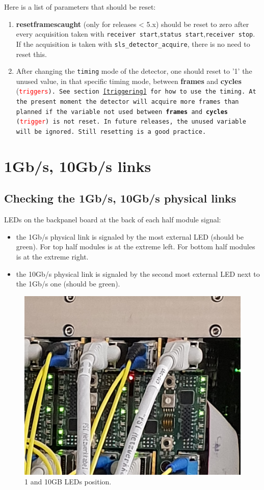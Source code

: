 \documentclass{article}
\begin{document}
{{{Here is a list of parameters that should be reset:
\begin{enumerate}
\item  \textbf{resetframescaught} (only for releases < 5.x) should be reset to zero after every acquisition taken with {\tt{receiver start}},{\tt{status start}},{\tt{receiver stop}}. If the acquisition is taken with {\tt{sls\_detector\_acquire}}, there is no need to reset this.
\item After changing the {\tt{timing}} mode of the detector, one should reset to '1' the unused value, in that specific timing mode, between \textbf{frames} and \textbf{cycles} (\tt{\textcolor{red}{triggers}}). See section~\ref{triggering} for how to use the timing. At the present moment the detector will acquire more frames than planned if the variable not used between \textbf{frames} and \textbf{cycles} (\tt{\textcolor{red}{trigger}}) is not reset. In future releases, the unused variable will be ignored. Still resetting is a good practice.
      
\end{enumerate}

\section{1Gb/s, 10Gb/s links}
\subsection{Checking the 1Gb/s, 10Gb/s physical links}\label{led}
LEDs on the backpanel board at the back of each half module signal:
\begin{itemize}
\item  the 1Gb/s physical link is signaled by the most external LED (should be green). For top half modules is at the extreme left. For bottom half modules is at the extreme right.  
\item the 10Gb/s physical link is signaled by the second most external LED next to the 1Gb/s one (should be green). 
\end{itemize}

\begin{figure}[t]
\begin{center}
\includegraphics[width=.7\textwidth]{LEDSim}
\end{center}
\caption{1 and 10GB LEDs position.}
\label{fLEDs}
\end{figure}




}}}
\end{document}
